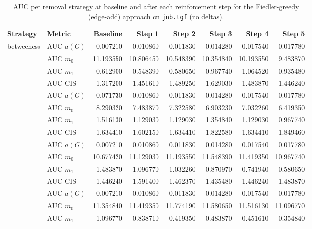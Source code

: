 \begin{table}[htbp]
  \centering
  \caption{AUC per removal strategy at baseline and after each reinforcement step for the Fiedler-greedy (edge-add) approach on \texttt{jnb.tgf} (no deltas).}
  \label{tab:jnb-fiedler_greedy-auc}
  \begin{tabular}{llrrrrrr}
    \toprule
    \textbf{Strategy} & \textbf{Metric} & \textbf{Baseline} & \textbf{Step 1} & \textbf{Step 2} & \textbf{Step 3} & \textbf{Step 4} & \textbf{Step 5} \\
    \midrule
    \multirow{4}{*}{betweeness} & AUC $a(G)$ & 0.007210 & 0.010860 & 0.011830 & 0.014280 & 0.017540 & 0.017780 \\
    & AUC $m_0$ & 11.193550 & 10.806450 & 10.548390 & 10.354840 & 10.193550 & 9.483870 \\
    & AUC $m_1$ & 0.612900 & 0.548390 & 0.580650 & 0.967740 & 1.064520 & 0.935480 \\
    & AUC CIS & 1.317200 & 1.451610 & 1.489250 & 1.629030 & 1.483870 & 1.446240 \\
    \addlinespace
    \multirow{4}{*}{closeness} & AUC $a(G)$ & 0.071730 & 0.010860 & 0.011830 & 0.014280 & 0.017540 & 0.017780 \\
    & AUC $m_0$ & 8.290320 & 7.483870 & 7.322580 & 6.903230 & 7.032260 & 6.419350 \\
    & AUC $m_1$ & 1.516130 & 1.129030 & 1.129030 & 1.354840 & 1.129030 & 0.967740 \\
    & AUC CIS & 1.634410 & 1.602150 & 1.634410 & 1.822580 & 1.634410 & 1.849460 \\
    \addlinespace
    \multirow{4}{*}{core influence} & AUC $a(G)$ & 0.007210 & 0.010860 & 0.011830 & 0.014280 & 0.017540 & 0.017780 \\
    & AUC $m_0$ & 10.677420 & 11.129030 & 11.193550 & 11.548390 & 11.419350 & 10.967740 \\
    & AUC $m_1$ & 1.483870 & 1.096770 & 1.032260 & 0.870970 & 0.741940 & 0.580650 \\
    & AUC CIS & 1.446240 & 1.591400 & 1.462370 & 1.435480 & 1.446240 & 1.483870 \\
    \addlinespace
    \multirow{4}{*}{degree} & AUC $a(G)$ & 0.007210 & 0.010860 & 0.011830 & 0.014280 & 0.017540 & 0.017780 \\
    & AUC $m_0$ & 11.354840 & 11.419350 & 11.774190 & 11.580650 & 11.516130 & 11.096770 \\
    & AUC $m_1$ & 1.096770 & 0.838710 & 0.419350 & 0.483870 & 0.451610 & 0.354840 \\

\end{tabular}
\end{table}
